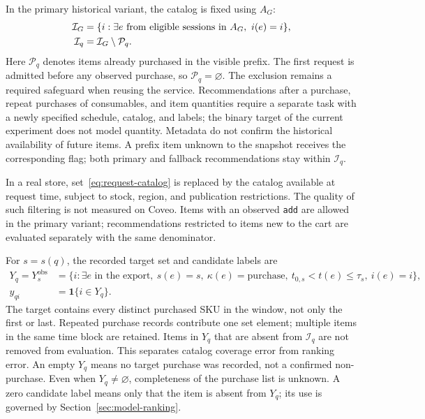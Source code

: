 \documentclass[12pt,a4paper]{article}
\newcommand{\code}[1]{{\ttfamily\small\nolinkurl{#1}}}
\newcommand{\ind}{\mathbf 1}
\theoremstyle{plainru}
\begin{document}
In the primary historical variant, the catalog is fixed using $A_G$:
\begin{align}
\mathcal I_G&=\{i:\exists e\text{ from eligible sessions in }A_G,\ i(e)=i\},\notag\\
\mathcal I_q&=\mathcal I_G\setminus\mathcal P_q.
\label{eq:request-catalog}
\end{align}
Here \(\mathcal P_q\) denotes items already purchased in the visible prefix.
The first request is admitted before any observed purchase,
so $\mathcal P_q=\varnothing$. The exclusion remains
a required safeguard when reusing the service. Recommendations
after a purchase, repeat purchases of consumables, and item quantities
require a separate task with a newly specified schedule,
catalog, and labels; the binary target of the current experiment does not model quantity.
Metadata do not confirm the historical availability of future items.
A prefix item unknown to the snapshot receives the corresponding flag;
both primary and fallback recommendations stay within \(\mathcal I_q\).

In a real store, set~\eqref{eq:request-catalog} is replaced
by the catalog available at request time, subject to stock,
region, and publication restrictions. The quality of such filtering is not measured on Coveo.
Items with an observed \code{add} are allowed in the primary variant;
recommendations restricted to items new to the cart are evaluated
separately with the same denominator.

For $s=s(q)$, the recorded target set and candidate labels are
\begin{align}
Y_q=Y_s^{\mathrm{obs}}&=\{i:\exists e\text{ in the export},\ s(e)=s,
\ \kappa(e)=\mathrm{purchase},\ t_{0,s}<t(e)\le\tau_s,\ i(e)=i\},
\label{eq:request-target}\\
y_{qi}&=\ind\{i\in Y_q\}.\label{eq:request-label}
\end{align}
The target contains every distinct purchased SKU in the window, not only the first
or last. Repeated purchase records contribute one set element;
multiple items in the same time block are retained.
Items in \(Y_q\) that are absent from \(\mathcal I_q\) are not removed
from evaluation. This separates catalog coverage error from ranking error.
An empty $Y_q$ means no target purchase was recorded, not a confirmed
non-purchase. Even when $Y_q\ne\varnothing$, completeness of the purchase list is unknown.
A zero candidate label means only that the item is absent from $Y_q$;
its use is governed by Section~\ref{sec:model-ranking}.
\end{document}

